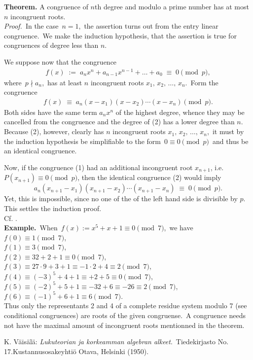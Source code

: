 \documentclass[12pt]{article}
\theoremstyle{definition}
\begin{document}
\textbf{Theorem.}\; A congruence of $n$th degree and modulo a prime number has at most $n$ incongruent roots.\\

\emph{Proof.}\, In the case \,$n = 1$,\, the assertion turns out from the entry linear congruence.\, We make the induction hypothesis, that the assertion is true for congruences of degree less than $n$.\, 

We suppose now that the congruence
\begin{align}
f(x) \;:=\; a_nx^n+a_{n-1}x^{n-1}+\ldots+a_0 \;\equiv\; 0 \pmod{p},
\end{align}
where\, $p \nmid a_n$,\, has at least $n$ incongruent roots $x_1,\,x_2,\,\ldots,\,x_n$.\, Form the congruence
\begin{align}
f(x) \;\equiv\; a_n(x-x_1)(x-x_2)\cdots(x-x_n) \pmod{p}.
\end{align}
Both sides have the same term $a_nx^n$ of the highest degree, whence they may be cancelled from the congruence and the degree of (2) has a lower degree than $n$.\, Because (2), however, clearly has $n$ incongruent roots 
$x_1,\,x_2,\,\ldots,\,x_n$,\, it must by the induction hypothesis be simplifiable to the form\, $0 \equiv 0 \pmod{p}$\, and thus be an identical congruence.

Now, if the congruence (1) had an additional incongruent root $x_{n+1}$, i.e.\, $P(x_{n+1}) \equiv 0 \pmod{p}$, then the identical congruence (2) would imply
$$a_n(x_{n+1}-x_1)(x_{n+1}-x_2)\cdots(x_{n+1}-x_n) \;\equiv\; 0 \pmod{p}.$$
Yet, this is impossible, since no one of the  of the left hand side is divisible by $p$.\, This settles the induction proof.\\

Cf. .\\

\textbf{Example.}\, When\, $f(x) := x^5\!+\!x\!+\!1 \equiv 0 \pmod{7}$,\, we have\\
$f(0) \equiv 1 \pmod{7}$,\\
$f(1) \equiv 3 \pmod{7}$,\\
$f(2) \equiv 32+2+1 \equiv 0 \pmod{7}$,\\
$f(3) \equiv 27\cdot9+3+1 \equiv -1\cdot2+4 \equiv 2 \pmod{7}$,\\
$f(4) \equiv (-3)^5+4+1 \equiv +2+5 \equiv 0 \pmod{7}$,\\
$f(5) \equiv (-2)^5+5+1 \equiv -32+6 \equiv -26 \equiv 2 \pmod{7}$,\\
$f(6) \equiv (-1)^5+6+1 \equiv 6 \pmod{7}$.\\
Thus only the representants 2 and 4 of a complete residue system modulo 7 (see conditional congruences) are roots of the given congruense.\, A congruence needs not have the maximal amount of incongruent roots mentionned in the theorem.






\begin{thebibliography}{9}
 {\sc K. V\"ais\"al\"a}: {\em Lukuteorian ja korkeamman algebran alkeet}.\, Tiedekirjasto No. 17.\quad  Kustannusosakeyhti\"o Otava, Helsinki (1950).
\end{thebibliography}



\end{document}

